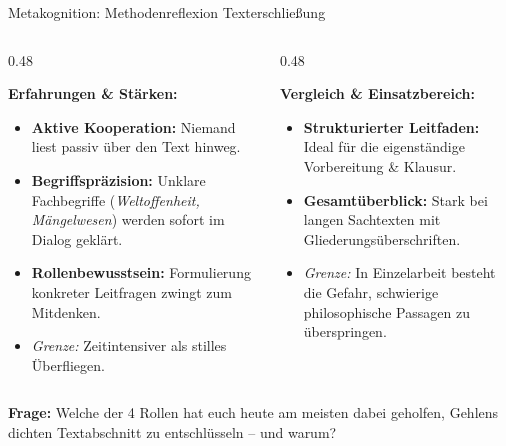 \documentclass[aspectratio=169, 10pt]{beamer}
\begin{document}
\begin{frame}{Metakognition: Methodenreflexion Texterschließung}
    \vspace{-0.2cm}
    \begin{columns}[T]
        \begin{column}{0.48\textwidth}
            \begin{tcolorbox}[modernCard, colframe=primaryBlue, colback=lightBlue, title={\faUsers\ Reziprokes Lesen (heute erprobt)}]
                \textbf{Erfahrungen \& Stärken:}
                \begin{itemize}\setlength{\itemsep}{2pt}\scriptsize
                    \item \textbf{Aktive Kooperation:} Niemand liest passiv \glqq über den Text hinweg\grqq.
                    \item \textbf{Begriffspräzision:} Unklare Fachbegriffe (\textit{Weltoffenheit, Mängelwesen}) werden sofort im Dialog geklärt.
                    \item \textbf{Rollenbewusstsein:} Formulierung konkreter Leitfragen zwingt zum Mitdenken.
                    \item \textit{Grenze:} Zeitintensiver als stilles Überfliegen.
                \end{itemize}
            \end{tcolorbox}
        \end{column}

        \begin{column}{0.48\textwidth}
            \begin{tcolorbox}[modernCard, colframe=subtleGray!40!black, colback=subtleGray, title={\faBookOpen\ 5-Schritt-Lesemethode (SQ3R)}]
                \textbf{Vergleich \& Einsatzbereich:}
                \begin{itemize}\setlength{\itemsep}{2pt}\scriptsize
                    \item \textbf{Strukturierter Leitfaden:} Ideal für die eigenständige Vorbereitung \& Klausur.
                    \item \textbf{Gesamtüberblick:} Stark bei langen Sachtexten mit Gliederungsüberschriften.
                    \item \textit{Grenze:} In Einzelarbeit besteht die Gefahr, schwierige philosophische Passagen zu überspringen.
                \end{itemize}
            \end{tcolorbox}
        \end{column}
    \end{columns}

    \vspace{0.2cm}
    \begin{tcolorbox}[alertCard, title={\faComments\ Reflexionsimpuls für das Plenum}]
        \centering\footnotesize
        \textbf{Frage:} Welche der 4 Rollen hat euch heute am meisten dabei geholfen, Gehlens dichten Textabschnitt zu entschlüsseln – und warum?
    \end{tcolorbox}
\end{frame}
\end{document}
